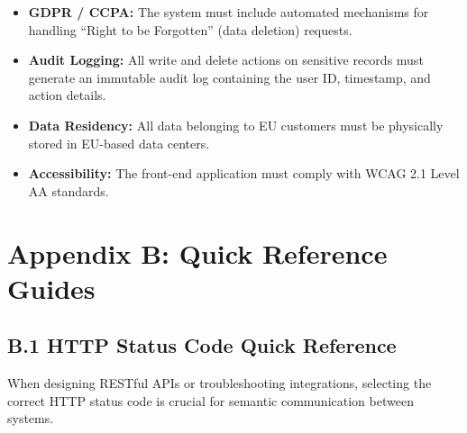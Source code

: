 \documentclass[
  11pt,
  openany,
  oneside]{book}
\providecommand{\tightlist}{%
  \setlength{\itemsep}{0pt}\setlength{\parskip}{0pt}}
\begin{document}
\begin{itemize}
\tightlist
\item
  \textbf{GDPR / CCPA:} The system must include automated mechanisms for
  handling ``Right to be Forgotten'' (data deletion) requests.
\item
  \textbf{Audit Logging:} All write and delete actions on sensitive
  records must generate an immutable audit log containing the user ID,
  timestamp, and action details.
\item
  \textbf{Data Residency:} All data belonging to EU customers must be
  physically stored in EU-based data centers.
\item
  \textbf{Accessibility:} The front-end application must comply with
  WCAG 2.1 Level AA standards.
\end{itemize}

\bigskip

\section{Appendix B: Quick Reference
Guides}\label{appendix-b-quick-reference-guides}

\subsection{B.1 HTTP Status Code Quick
Reference}\label{b.1-http-status-code-quick-reference}

When designing RESTful APIs or troubleshooting integrations, selecting
the correct HTTP status code is crucial for semantic communication
between systems.
\end{document}
